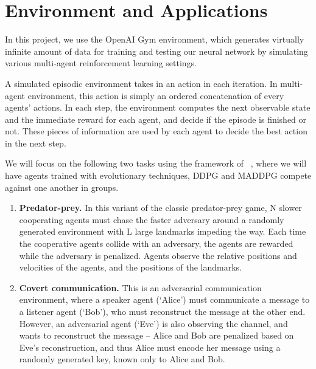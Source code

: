 
\section{Environment and Applications}
\label{sec:application}

In this project, we use the OpenAI Gym environment, which generates virtually
infinite amount of data for training and testing our neural network by
simulating various multi-agent reinforcement learning settings.

A simulated episodic environment takes in an action in each iteration. In
multi-agent environment, this action is simply an ordered concatenation of
every agents' actions. In each step, the environment computes the next
observable state and the immediate reward for each agent, and decide if the
episode is finished or not. These pieces of information are used by each agent
to decide the best action in the next step.

We will focus on the following two tasks using the framework of ~\cite{lowe2017multi}, 
where we will have agents trained with evolutionary techniques, DDPG and 
MADDPG compete against one another in groups.

\begin{enumerate}

\item \textbf{Predator-prey.} In this variant of the classic predator-prey
game, N slower cooperating agents must chase the faster adversary around a
randomly generated environment with L large landmarks impeding the way. Each
time the cooperative agents collide with an adversary, the agents are rewarded
while the adversary is penalized. Agents observe the relative positions and
velocities of the agents, and the positions of the landmarks.


\item \textbf{Covert communication.} This is an adversarial communication
environment, where a speaker agent (‘Alice’) must communicate a message to a
listener agent (‘Bob’), who must reconstruct the message at the other end.
However, an adversarial agent (‘Eve’) is also observing the channel, and wants
to reconstruct the message -- Alice and Bob are penalized based on Eve’s
reconstruction, and thus Alice must encode her message using a randomly
generated key, known only to Alice and Bob.

\end{enumerate}


